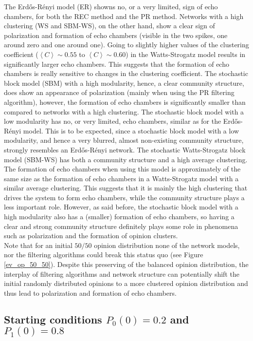 \documentclass[11 pt , letterpaper , twoside , openright]{book}
\begin{document}
The Erd\H{o}s-R\'{e}nyi model (ER) showns no, or a very limited, sign of echo chambers, for both the REC method and the PR method. Networks with a high clustering (WS and SBM-WS), on the other hand, show a clear sign of polarization and formation of echo chambers (visible in the two spikes, one around zero and one around one). Going to slightly higher values of the clustering coefficient ($\left<C\right> \sim 0.55$ to $\left<C\right> \sim 0.60$) in the Watts-Strogatz model results in significantly larger echo chambers. This suggests that the formation of echo chambers is really sensitive to changes in the clustering coefficient. The stochastic block model (SBM) with a high modularity, hence, a clear community structure, does show an appearance of polarization (mainly when using the PR filtering algorithm), however, the formation of echo chambers is significantly smaller than compared to networks with a high clustering. The stochastic block model with a low modularity has no, or very limited, echo chambers, similar as for the Erd\H{o}s-R\'{e}nyi   
model. This is to be expected, since a stochastic block model with a low modularity, and hence a very blurred, almost non-existing community structure, strongly resembles an Erd\H{o}s-R\'{e}nyi network. The stochastic Watts-Strogatz block model (SBM-WS) has both a community structure and a high average clustering. The formation of echo chambers when using this model is approximately of the same size as the formation of echo chambers in a Watts-Strogatz model with a similar average clustering. This suggests that it is mainly the high clustering that drives the system to form echo chambers, while the community structure plays a less important role. However, as said before, the stochastic block model with a high modularity also has a (smaller) formation of echo chambers, so having a clear and strong community structure definitely plays some role in phenomena such as polarization and the formation of opinion clusters. \\
Note that for an initial $50/50$ opinion distribution none of the network models, nor the filtering algorithms could break this status quo (see Figure \ref{ev_op_50_50}). Despite this preserving of the balanced opinion distribution, the interplay of filtering algorithms and network structure can potentially shift the initial randomly distributed opinions to a more clustered opinion distribution and thus lead to polarization and formation of echo chambers.


\subsection{Starting conditions $P_0(0) = 0.2$ and $P_1(0)=0.8$}\label{20-80}
\end{document}
